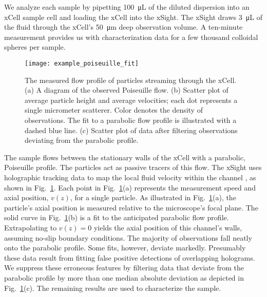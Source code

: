 We analyze each sample by pipetting \SI{100}{\micro\liter} of the diluted dispersion into an
xCell sample cell and loading the xCell into the xSight. The xSight draws \SI{3}{\micro\liter}
of the fluid through
the xCell's \SI{50}{\um} deep observation volume. A ten-minute measurement provides us with
characterization data for a few thousand colloidal spheres per sample.

\begin{figure}
    \centering
    \texttt{[image: example\_poiseuille\_fit]}
    \caption{The measured flow profile of particles streaming through the xCell.
      (a)  A diagram of the observed Poiseuille flow.\protect\footnotemark 
      (b) Scatter plot of average particle height and average velocities; each
      dot represents a single micrometer scatterer. Color denotes the density of
      observations. The fit to a parabolic flow profile is illustrated with a dashed
      blue line. (c) Scatter plot of data after filtering observations deviating
      from the parabolic profile.}
    \label{fig:flow_prof}
\end{figure}


The sample flows between the stationary walls of the xCell with a parabolic, Poiseuille
profile.
The particles act as passive tracers of this flow.
The xSight uses holographic tracking data to map the local fluid velocity within
the channel \cite{cheong10a}, as shown in Fig.~\ref{fig:flow_prof}.
Each point in Fig.~\ref{fig:flow_prof}(a) represents the measurement speed
and axial position, $v(z)$, for a single particle.
As illustrated in Fig.~\ref{fig:flow_prof}(a),
the particle's axial position is measured relative to the microscope's
focal plane. The solid curve in Fig.~\ref{fig:flow_prof}(b) is a fit to the
anticipated parabolic flow profile. Extrapolating to $v(z)=0$ yields the
axial position of this channel's walls, assuming
no-slip boundary conditions. 
The majority of observations fall neatly onto the parabolic profile.
Some fits, however, deviate markedly. Presumably these data result from fitting
false positive detections of overlapping holograms.
We suppress these erroneous features by filtering data that deviate from
the parabolic profile by more than one median absolute deviation
as depicted in Fig.~\ref{fig:flow_prof}(c). The remaining results are used
to characterize the sample.

